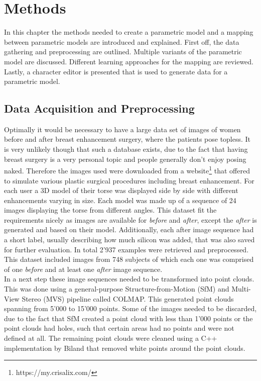\chapter{Methods}
In this chapter the methods needed to create a parametric model and  a mapping between parametric models are introduced and explained. First off, the data gathering and preprocessing are outlined. Multiple variants of the parametric model are discussed. Different learning approaches for the mapping are reviewed. Lastly, a character editor is presented that is used to generate data for a parametric model.

\section{Data Acquisition and Preprocessing}
Optimally it would be necessary to have a large data set of images of women before and after breast enhancement surgery, where the patients pose topless. It is very unlikely though that such a database exists, due to the fact that having breast surgery is a very personal topic and people generally don't enjoy posing naked. Therefore the images used were downloaded from a website\footnote{https://my.crisalix.com/} that offered to simulate various plastic surgical procedures including breast enhancement. For each user a 3D model of their torse was displayed side by side with different enhancements varying in size. Each model was made up of a sequence of 24 images displaying the torse from different angles. This dataset fit the requirements nicely as images are available for \textit{before} and \textit{after}, except the \textit{after} is generated and based on their model. Additionally, each after image sequence had a short label, usually describing how much silicon was added, that was also saved for further evaluation. In total 2'937 examples were retrieved and preprocessed. This dataset included images from 748 subjects of which each one was comprised of one \textit{before} and at least one \textit{after} image sequence.\\

In a next step these image sequences needed to be transformed into point clouds. This was done using a general-purpose Structure-from-Motion (SfM) \cite{schoenberger2016sfm} and Multi-View Stereo (MVS) \cite{schoenberger2016mvs} pipeline called COLMAP. This generated point clouds spanning from 5'000 to 15'000 points. Some of the images needed to be discarded, due to the fact that SfM created a point cloud with less than 1'000 points or the point clouds had holes, such that certain areas had no points and were not defined at all. The remaining point clouds were cleaned using a C++ implementation by Biland \cite{Biland17} that removed white points around the point clouds.

